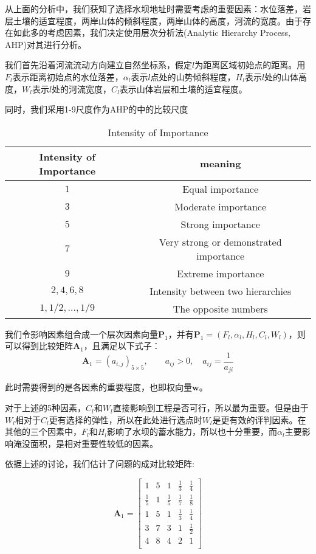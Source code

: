 \documentclass[nocover]{cumcmart}
\begin{document}
从上面的分析中，我们获知了选择水坝地址时需要考虑的重要因素：水位落差，岩层土壤的适宜程度，两岸山体的倾斜程度，两岸山体的高度，河流的宽度。由于存在如此多的考虑因素，我们决定使用层次分析法(Analytic Hierarchy Process, AHP)对其进行分析。

我们首先沿着河流流动方向建立自然坐标系，假定$l$为距离区域初始点的距离。用$F_{l}$表示距离初始点的水位落差，$\alpha_{l}$表示$l$点处的山势倾斜程度，$H_{l}$表示$l$处的山体高度，$W_{l}$表示$l$处的河流宽度，$C_{l}$表示山体岩层和土壤的适宜程度。

同时，我们采用1-9尺度作为AHP的中的比较尺度
\begin{table}[!ht]
\centering
  \begin{tabular}{cc}
  \hline
   Intensity of Importance & meaning  \\
  \hline
  $1$ & Equal importance \\
  $3$ & Moderate importance \\
  $5$ & Strong importance \\
  $7$ & Very strong or demonstrated importance \\
  $9$ & Extreme importance \\
  $2,4,6,8$ & Intensity between two hierarchies \\
  $1,1/2,...,1/9$ & The opposite numbers\\
  \hline
  \end{tabular}
  \caption{Intensity of Importance}
\end{table}

我们令影响因素组合成一个层次因素向量$\textbf{P}_1$，并有$\textbf{P}_1 = (F_{l}, \alpha_{l}, H_{l}, C_{l}, W_{l})$，则可以得到比较矩阵$\textbf{A}_1$，且满足以下式子：
\begin{equation}
\textbf{A}_1 = (a_{i,j})_{5\times5},\qquad a_{ij} > 0, \quad a_{ij} = \frac{1}{a_{ji}}
\end{equation}

此时需要得到的是各因素的重要程度，也即权向量$\textbf{w}$。

对于上述的5种因素，$C_{l}$和$W_{l}$直接影响到工程是否可行，所以最为重要。但是由于$W_{l}$相对于$C_{l}$更有选择的弹性，所以在此处进行选点时$W_{l}$是更有效的评判因素。在其他的三个因素中，$F_{l}$和$H_{l}$影响了水坝的蓄水能力，所以也十分重要，而$\alpha_{l}$主要影响淹没面积，是相对重要性较低的因素。

依据上述的讨论，我们估计了问题的成对比较矩阵:

\[\textbf{A}_1 = 
\left[
\begin{matrix}
1 & 5 & 1 & \frac{1}{3} & \frac{1}{4} \\
\frac{1}{5}  & 1 & \frac{1}{5} & \frac{1}{7} & \frac{1}{8} \\ 
1 & 5 & 1 & \frac{1}{3} & \frac{1}{4} \\
3 & 7 & 3 & 1 & \frac{1}{2} \\
4 & 8 & 4 & 2 & 1 \\
\end{matrix}
\right]
\]
\end{document}
